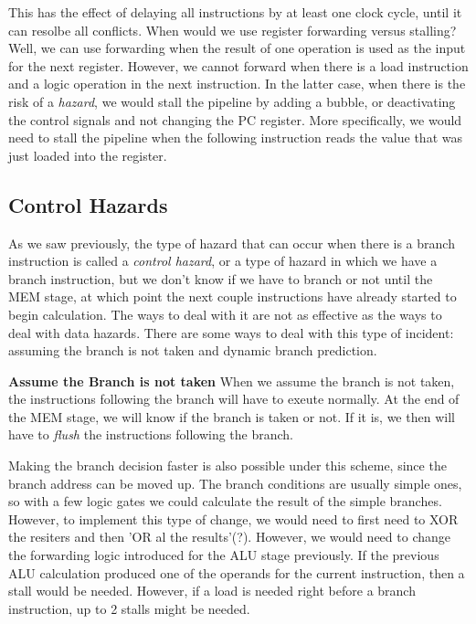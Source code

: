 \documentclass{article}
\begin{document}
This has the effect of delaying all instructions by at least one clock cycle, until it can resolbe all conflicts.
When would we use register forwarding versus stalling? Well, we can use forwarding when the result of one
operation is used as the input for the next register. However, we cannot forward when there is a load
instruction and a logic operation in the next instruction. In the latter case, when there is the risk
of a \textit{hazard}, we would stall the pipeline by adding a bubble, or deactivating the control 
signals and not changing the PC register. More specifically, we would need to stall the pipeline when 
the following instruction reads the value that was just loaded into the register.

\subsection{Control Hazards}
As we saw previously, the type of hazard that can occur when there is a branch instruction is called a
\textit{control hazard}, or a type of hazard in which we have a branch instruction, but we don't know
if we have to branch or not until the MEM stage, at which point the next couple instructions have
already started to begin calculation. The ways to deal with it are not as effective as the 
ways to deal with data hazards. There are some ways to deal with this type of incident: assuming
the branch is not taken and dynamic branch prediction.

\hspace{10mm}\textbf{Assume the Branch is not taken}
When we assume the branch is not taken, the instructions following the branch will have to exeute normally. 
At the end of the MEM stage, we will know if the branch is taken or not. If it is, we then will have to
\textit{flush} the instructions following the branch.

Making the branch decision faster is also possible under this scheme, since the branch address can be moved
up. The branch conditions are usually simple ones, so with a few logic gates we could calculate the 
result of the simple branches. However, to implement this type of change, we would need to first need to XOR
the resiters and then 'OR al the results'(?). However, we would need to change the forwarding logic introduced
for the ALU stage previously. If the previous ALU calculation produced one of the operands for the current 
instruction, then a stall would be needed. However, if a load is needed right before a branch instruction,
up to 2 stalls might be needed.
\end{document}
